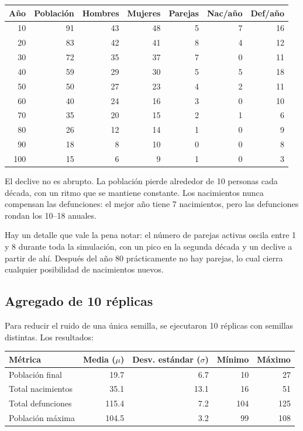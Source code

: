 \documentclass[12pt,a4paper]{article}
\begin{document}
\begin{center}
\begin{tabular}{rrrrrrr}
\toprule
\textbf{Año} & \textbf{Población} & \textbf{Hombres} & \textbf{Mujeres} & \textbf{Parejas} & \textbf{Nac/año} & \textbf{Def/año} \\
\midrule
 10 & 91 & 43 & 48 & 5 & 7 & 16 \\
 20 & 83 & 42 & 41 & 8 & 4 & 12 \\
 30 & 72 & 35 & 37 & 7 & 0 & 11 \\
 40 & 59 & 29 & 30 & 5 & 5 & 18 \\
 50 & 50 & 27 & 23 & 4 & 2 & 11 \\
 60 & 40 & 24 & 16 & 3 & 0 & 10 \\
 70 & 35 & 20 & 15 & 2 & 1 &  6 \\
 80 & 26 & 12 & 14 & 1 & 0 &  9 \\
 90 & 18 &  8 & 10 & 0 & 0 &  8 \\
100 & 15 &  6 &  9 & 1 & 0 &  3 \\
\bottomrule
\end{tabular}
\end{center}

El declive no es abrupto. La población pierde alrededor de 10 personas cada década, con un ritmo que se mantiene constante. Los nacimientos nunca compensan las defunciones: el mejor año tiene 7 nacimientos, pero las defunciones rondan los 10--18 anuales.

Hay un detalle que vale la pena notar: el número de parejas activas oscila entre 1 y 8 durante toda la simulación, con un pico en la segunda década y un declive a partir de ahí. Después del año 80 prácticamente no hay parejas, lo cual cierra cualquier posibilidad de nacimientos nuevos.

\subsection{Agregado de 10 réplicas}

Para reducir el ruido de una única semilla, se ejecutaron 10 réplicas con semillas distintas. Los resultados:

\begin{center}
\begin{tabular}{lrrrr}
\toprule
\textbf{Métrica} & \textbf{Media ($\mu$)} & \textbf{Desv. estándar ($\sigma$)} & \textbf{Mínimo} & \textbf{Máximo} \\
\midrule
Población final   &  19.7 &  6.7 &  10 &  27 \\
Total nacimientos &  35.1 & 13.1 &  16 &  51 \\
Total defunciones & 115.4 &  7.2 & 104 & 125 \\
Población máxima  & 104.5 &  3.2 &  99 & 108 \\
\bottomrule
\end{tabular}
\end{center}
\end{document}
